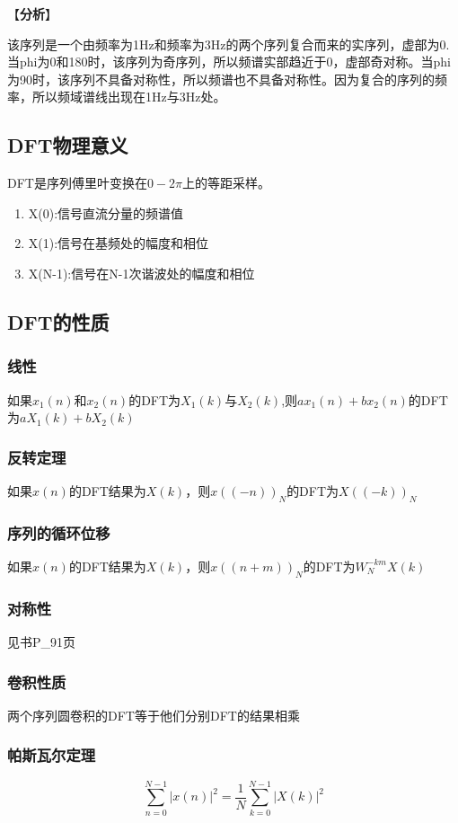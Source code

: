 \documentclass{../source/zjureport}
\begin{document}
                【\textbf{分析}】
                
                该序列是一个由频率为1Hz和频率为3Hz的两个序列复合而来的实序列，虚部为0.当phi为0和180时，该序列为奇序列，所以频谱实部趋近于0，虚部奇对称。当phi为90时，该序列不具备对称性，所以频谱也不具备对称性。因为复合的序列的频率，所以频域谱线出现在1Hz与3Hz处。

        \subsection{DFT物理意义}
            DFT是序列傅里叶变换在$0-2\pi$上的等距采样。
            \begin{enumerate}
                \item X(0):信号直流分量的频谱值
                \item X(1):信号在基频处的幅度和相位
                \item X(N-1):信号在N-1次谐波处的幅度和相位
            \end{enumerate}

        \subsection{DFT的性质}
            \subsubsection{线性}
            如果$x_1(n)$和$x_2(n)$的DFT为$X_1(k)$与$X_2(k)$,则$ax_1(n)+bx_2(n)$的DFT为$aX_1(k)+bX_2(k)$
            \subsubsection{反转定理}
            如果$x(n)$的DFT结果为$X(k)$，则$x((-n))_N$的DFT为$X((-k))_N$
            \subsubsection{序列的循环位移}
            如果$x(n)$的DFT结果为$X(k)$，则$x((n+m))_N$的DFT为$W_N^{-km}X(k)$
            \subsubsection{对称性}
            见书P_91页
            \subsubsection{卷积性质}
            两个序列圆卷积的DFT等于他们分别DFT的结果相乘
            \subsubsection{帕斯瓦尔定理}
            $$\sum_{n=0}^{N-1}|x(n)|^2 = \frac{1}{N}\sum_{k=0}^{N-1}|X(k)|^2$$

        
            
            



    
\end{document}
